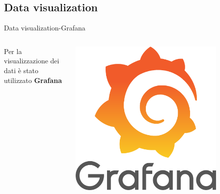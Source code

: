 \documentclass[13pt,aspectratio=169,t,xcolor=table]{beamer}
\begin{document}
\subsection{Data visualization}
\begin{frame}{Data visualization-Grafana}
    \begin{columns}
        
            Per la visualizzazione dei dati è stato utilizzato \textbf{Grafana}
        
            \begin{minipage}{0.5\textwidth}
                \raggedleft
                \includegraphics[width=0.8\textwidth]{res/grafana_icon.png}
            \end{minipage}
    \end{columns}


\end{frame}
\end{document}
